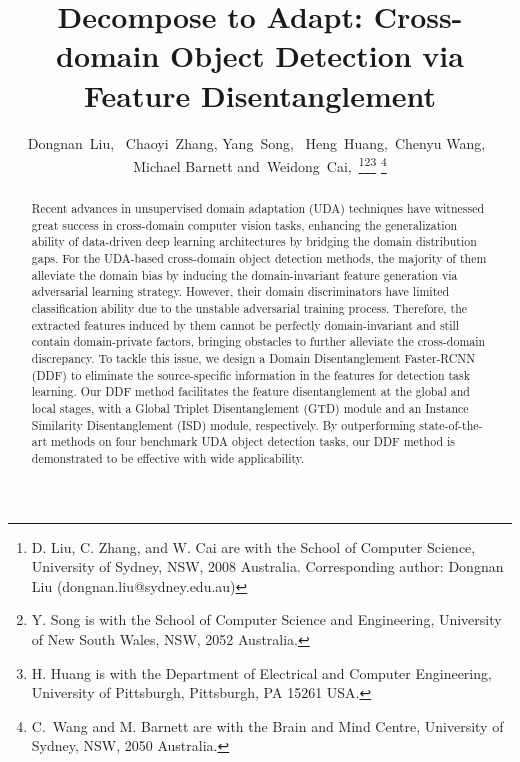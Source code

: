 \documentclass[journal]{IEEEtran}
\begin{document}
\title{Decompose to Adapt: Cross-domain Object Detection via Feature Disentanglement}


\author{Dongnan~Liu,~
        Chaoyi~Zhang, Yang~Song,~
        Heng~Huang,~Chenyu Wang,~\\Michael Barnett
        and~Weidong~Cai,~\thanks{D. Liu, C. Zhang, and W. Cai are with the School of Computer Science, University of Sydney, NSW,
2008 Australia. Corresponding author: Dongnan Liu (dongnan.liu@sydney.edu.au)}\thanks{Y. Song is with the School of Computer Science and Engineering, University of New South Wales, NSW, 2052 Australia.}\thanks{H. Huang is with the Department of Electrical and Computer Engineering, University of Pittsburgh, Pittsburgh, PA 15261 USA.}
\thanks{C.~Wang and M. Barnett are with the Brain and Mind Centre, University of Sydney, NSW, 2050 Australia.}}
























\maketitle

\begin{abstract}

Recent advances in unsupervised domain adaptation (UDA) techniques have witnessed great success in cross-domain computer vision tasks, enhancing the generalization ability of data-driven deep learning architectures by bridging the domain distribution gaps. For the UDA-based cross-domain object detection methods, the majority of them alleviate the domain bias by inducing the domain-invariant feature generation via adversarial learning strategy. However, their domain discriminators have limited classification ability due to the unstable adversarial training process. Therefore, the extracted features induced by them cannot be perfectly domain-invariant and still contain domain-private factors, bringing obstacles to further alleviate the cross-domain discrepancy. To tackle this issue, we design a Domain Disentanglement Faster-RCNN (DDF) to eliminate the source-specific information in the features for detection task learning. Our DDF method facilitates the feature disentanglement at the global and local stages, with a Global Triplet Disentanglement (GTD) module and an Instance Similarity Disentanglement (ISD) module, respectively. By outperforming state-of-the-art methods on four benchmark UDA object detection tasks, our DDF method is demonstrated to be effective with wide applicability.

\end{abstract}
\end{document}
